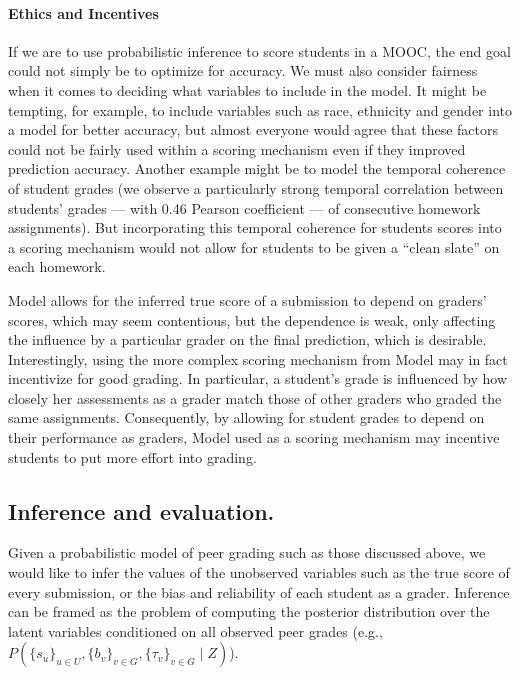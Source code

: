 \paragraph{Ethics and Incentives} 
If we are to use probabilistic inference to score students in a MOOC,
the end goal could not simply be to optimize for accuracy.
We must also consider fairness when it comes to deciding
what variables to include in the model. It might be tempting, for 
example, to include variables such as race, ethnicity and gender into a model for better accuracy, but almost everyone
would agree that these factors could not be fairly used within a
scoring mechanism even if they improved prediction accuracy. Another 
example might be to model the temporal coherence of student grades (we observe a particularly strong
temporal correlation between students' grades --- with 0.46 Pearson
coefficient --- of consecutive homework assignments). But incorporating this temporal coherence for students scores
into a scoring mechanism would
not allow for students to be given a ``clean slate'' on each
homework.

Model \PGthree allows for the inferred true score of a submission
to depend on graders' scores, which may seem contentious,
but the dependence is weak, only affecting the influence by
a particular grader on the final prediction, which is desirable. Interestingly, using the more complex scoring mechanism from Model \PGthree may 
in fact incentivize for good
grading. In particular, a student's grade is influenced by
how closely her assessments as a grader match those of other
graders who graded the same assignments. Consequently, by
allowing for student grades to depend on their performance
as graders, Model \PGthree used as a scoring mechanism may
incentive students to put more effort into grading.

\subsection{Inference and evaluation.}
Given a probabilistic model of peer grading such as those discussed above, 
we would like to infer the values of the unobserved variables such as the  true score of 
every submission, or the bias and reliability of each student as a grader.
Inference can be framed as the problem of computing the posterior distribution over the 
latent variables conditioned on all observed peer grades (e.g., $P(\{s_u\}_{u\in U}, \{b_v\}_{v\in G}, \{\tau_v\}_{v\in G}  \;|\; Z)$).

